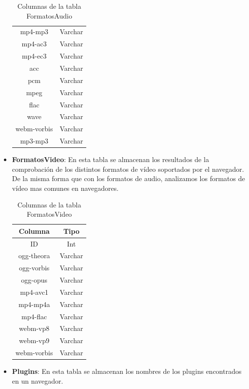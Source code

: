 \begin{itemize}
\begin{table}[H]
\begin{tabular}{c|c}
            mp4-mp3 & Varchar\\
            mp4-ac3 & Varchar\\
            mp4-ec3 & Varchar\\
            acc & Varchar\\
            pcm & Varchar\\
            mpeg & Varchar\\
            flac & Varchar\\
            wave & Varchar\\
            webm-vorbis & Varchar\\
            mp3-mp3 & Varchar\\
        \end{tabular}
        \caption{Columnas de la tabla FormatosAudio}
        \label{tab:formatosAudio}
    \end{table}
    \item \textbf{FormatosVideo}: En esta tabla se almacenan los resultados de la comprobación de los distintos formatos de vídeo soportados por el navegador. De la misma forma que con los formatos de audio, analizamos los formatos de vídeo mas comunes en navegadores.\cite{Formatos}\par
    \begin{table}[H]
        \centering
        \begin{tabular}{c|c}
            Columna & Tipo \\ \hline
            ID & Int\\
            ogg-theora & Varchar\\
            ogg-vorbis & Varchar\\
            ogg-opus & Varchar\\
            mp4-avc1 & Varchar\\
            mp4-mp4a & Varchar\\
            mp4-flac & Varchar\\
            webm-vp8 & Varchar\\
            webm-vp9 & Varchar\\
            webm-vorbis & Varchar\\
        \end{tabular}
        \caption{Columnas de la tabla FormatosVideo}
        \label{tab:formatosVideo}
    \end{table}
    \item \textbf{Plugins}: En esta tabla se almacenan los nombres de los plugins encontrados en un navegador.
    \begin{table}[H]

\end{table}
\end{itemize}
